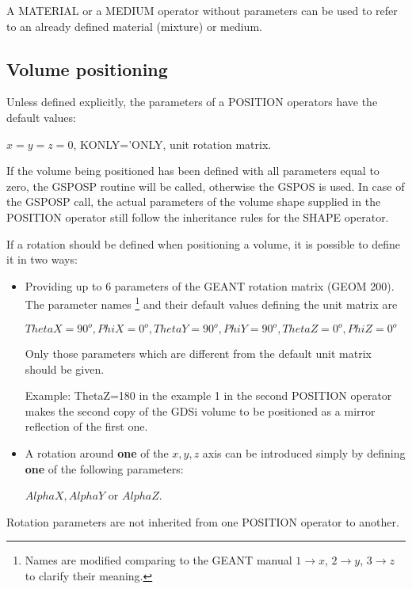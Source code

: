 A MATERIAL or a MEDIUM operator without parameters
can be used to refer to an already defined material (mixture) or
medium.

\subsection{Volume positioning}

Unless defined explicitly, the parameters of a POSITION operators 
have the default values: 
\begin{center}
 $x=y=z=0$, KONLY='ONLY, unit rotation matrix.
\end{center}

If the volume being positioned has been defined with all parameters
equal to zero, the GSPOSP routine will be called, 
otherwise the GSPOS is used. 
In case of the GSPOSP call, the actual parameters of the volume shape
supplied in the POSITION operator still follow the inheritance rules
for the SHAPE operator.

If a rotation should be defined when positioning a volume,
it is possible to define it in two ways:
\begin{itemize}
\item
Providing up to 6 parameters of the GEANT rotation matrix (GEOM 200).
The parameter names 
\footnote{Names are modified comparing to the GEANT manual 
$1 \rightarrow x$, $2 \rightarrow y$, $3 \rightarrow z$ 
to clarify their meaning.}
and their default values defining the unit matrix are
\begin{center}
$ThetaX=90^o, PhiX=0^o, ThetaY=90^o, PhiY=90^o, ThetaZ=0^o, PhiZ=0^o$ 
\end{center}
Only those parameters which are different from 
the default unit matrix should be given.

Example: ThetaZ=180 in the example 1 in the second POSITION operator
makes  the second copy of the GDSi volume to be positioned 
as a mirror reflection of the first one.

\item
A rotation around {\bf one} of the $x,y,z$ axis can be introduced 
simply by defining {\bf one} of the following  parameters:
\begin{center}
$AlphaX, AlphaY$ or $AlphaZ$.
\end{center}

\end{itemize}

Rotation parameters are not inherited from one POSITION operator 
to another.
 
